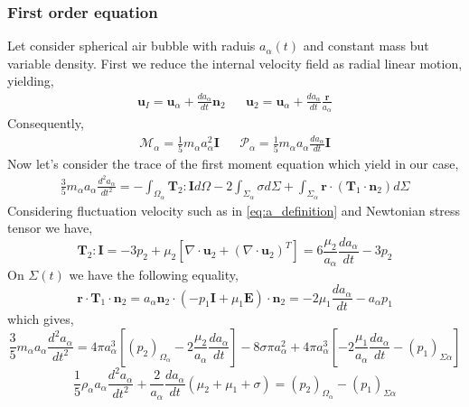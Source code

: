 \subsubsection{First order equation}
Let consider spherical air bubble with raduis $a_\alpha(t)$ and constant mass but variable density.
First we reduce the internal velocity field as radial linear motion, yielding, 
\begin{align}
    \textbf{u}_I = \textbf{u}_\alpha + \frac{d a_\alpha}{dt} \textbf{n}_2
    &&
    \textbf{u}_2 = \textbf{u}_\alpha + \frac{d a_\alpha}{dt} \frac{\textbf{r}}{a_\alpha} 
    \label{eq:a_definition}
\end{align}
Consequently, 
\begin{align*}
    \mathcal{M}_\alpha 
    = \frac{1}{5} m_\alpha a_\alpha^2 \textbf{I}
    &&
    \mathcal{P}_\alpha 
    = \frac{1}{5} m_\alpha a_\alpha \frac{d a_\alpha}{dt} \textbf{I}
\end{align*}
Now let's consider the trace of the first moment equation which yield in our case,
\begin{multline}
    \frac{3}{5}
    m_\alpha 
    a_\alpha
    \frac{d^2 a_\alpha}{dt^2}
    = - \int_{\Omega_\alpha} 
         \mathbf{T}_2 : \textbf{I}
         d\Omega
        - 2\int_{\Sigma_\alpha} \sigma d\Sigma
        + \int_{\Sigma_\alpha} \textbf{r}\cdot(\textbf{T}_1\cdot\textbf{n}_2) d\Sigma
\end{multline}
Considering fluctuation velocity such as in \ref{eq:a_definition} and Newtonian stress tensor we have, 
\begin{equation*}
    \mathbf{T}_2 : \textbf{I}
    = 
    -  3p_2
    + \mu_2 \left[
        \nabla \cdot \textbf{u}_2 
        + (\nabla \cdot \textbf{u}_2 )^T
    \right]
    = 
    6\frac{\mu_2}{a_\alpha}\frac{d a_\alpha}{dt} 
    -3 p_2
\end{equation*}
On $\Sigma(t)$ we have the following equality,
\begin{equation}
    \textbf{r}\cdot\textbf{T}_1\cdot\textbf{n}_2 
    = a_\alpha \textbf{n}_2\cdot(-p_1 \textbf{I}+ \mu_1 \textbf{E})\cdot\textbf{n}_2 
    = -2\mu_1\frac{d a_\alpha}{dt}-a_\alpha p_1
\end{equation}
which gives,
\begin{equation}
    \frac{3}{5}
    m_\alpha 
    a_\alpha
    \frac{d^2 a_\alpha}{dt^2}
    = 4\pi a_\alpha^3\left[
         (p_2)_{\Omega_{\alpha}}
        - 2\frac{\mu_2}{a_\alpha}\frac{d a_\alpha}{dt} 
    \right]
    - 8\sigma  \pi a_\alpha^2
    + 4 \pi a^3_\alpha \left[
        - 2\frac{\mu_1}{a_\alpha} \frac{d a_\alpha}{dt}
        -  (p_1)_{\Sigma\alpha}
    \right]
\end{equation}
\begin{equation}
    \frac{1}{5}
    \rho_\alpha 
    a_\alpha
    \frac{d^2 a_\alpha}{dt^2}
    + \frac{2}{a_\alpha}\frac{d a_\alpha}{dt} \left(
        \mu_2 
        + \mu_1 
        + \sigma
    \right)
    = 
         (p_2)_{\Omega_{\alpha}}
        - \left(p_1\right)_{\Sigma\alpha}
\end{equation}


